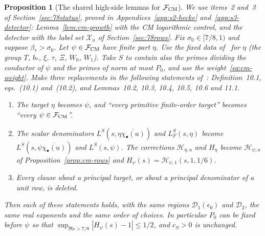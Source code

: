 \documentclass[11pt]{article}
\numberwithin{equation}{section}
\newtheorem{proposition}{Proposition}
\begin{document}
\begin{proposition}[The shared high-side lemmas for $\mathcal F_{\rm CM}$]\label{prop:s6-shared}
We use items~2 and~3 of Section~\ref{sec:78status}, proved in Appendices~\ref{app:s2-hecke}
and~\ref{app:s3-detector}: Lemma~\ref{lem:cm-growth} with the CM logarithmic control, and the detector with the
label set $\mathcal X_u$ of Section~\ref{sec:78rows}. Fix $\sigma_0\in[7/8,1)$ and
suppose $\beta_*>\sigma_0$. Let $\psi\in\mathcal F_{\rm CM}$ have finite part $\eta$. Use the fixed data
of~\cite[Section~6]{OAI78} for $\eta$ (the group $T$, $b_*$, $\xi$, $\tau$, $\Xi$, $W_0$, $W_1$). Take
$S$ to contain also the primes dividing the conductor of $\psi$ and the primes of norm at most $P_0$, and use
the weight~\eqref{eq:cm-weight}. Make three replacements in the following statements of~\cite{OAI78}:
Definition~10.1, eqs.~(10.1) and~(10.2), and
Lemmas~10.2, 10.3, 10.4,
10.5, 10.6 and 11.1.
\begin{enumerate}
\item[(i)] The target $\eta$ becomes $\psi$, and ``every primitive finite-order target'' becomes ``every
 $\psi\in\mathcal F_{\rm CM}$''.
\item[(ii)] The scalar denominators $L^S(s,\eta\overline{\chi_\bullet(u)})$ and $L_F^S(s,\eta)$ become
 $L^S(s,\psi\overline{\chi_\bullet(u)})$ and $L^S(s,\psi)$. The corrections $\mathcal H_{\eta,u}$ and $H_\eta$
 become $\mathcal H_{\psi,u}$ of Proposition~\ref{prop:cm-rows} and $H_\psi(s)=\mathcal H_{\psi,1}(s,1,1/6)$.
\item[(iii)] Every clause about a principal target, or about a principal denominator of a unit row, is
 deleted.
\end{enumerate}
Then each of these statements holds, with the same regions $\mathcal D_1(\epsilon_0)$ and $\mathcal D_2$, the
same real exponents and the same order of choices. In particular $P_0$ can be fixed before $\psi$ so that
$\sup_{\Re s>7/8}|H_\psi(s)-1|\le1/2$, and $c_S>0$ is unchanged.
\end{proposition}
\end{document}
